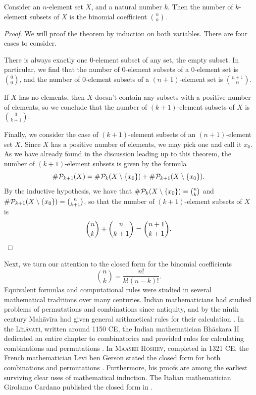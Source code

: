 \begin{theorem}
  Consider an $n$-element set $X$, and a natural number $k$. Then the number of $k$-element subsets of $X$ is the binomial coefficient $\binom{n}{k}$.
\end{theorem}

\begin{proof}
  We will proof the theorem by induction on both variables. There are four cases to consider.

  There is always exactly one $0$-element subset of any set, the empty subset. In particular, we find that the number of $0$-element subsets of a $0$-element set is $\binom{0}{0}$, and the number of $0$-element subsets of a $(n+1)$-element set is $\binom{n+1}{0}$.

  If $X$ has no elements, then $X$ doesn't contain any subsets with a positive number of elements, so we conclude that the number of $(k+1)$-element subsets of $X$ is $\binom{0}{k+1}$.

  Finally, we consider the case of $(k+1)$-element subsets of an $(n+1)$-element set $X$. Since $X$ has a positive number of elements, we may pick one and call it $x_0$. As we have already found in the discussion leading up to this theorem, the number of $(k+1)$-element subsets is given by the formula
  \begin{equation*}
    \mathord{\#}\mkern1mu \mathcal{P}_{k+1}(X)= \mathord{\#}\mkern1mu \mathcal{P}_k(X\setminus\{x_0\})+\mathord{\#}\mkern1mu \mathcal{P}_{k+1}(X\setminus\{x_0\}).
  \end{equation*}
  By the inductive hypothesis, we have that $\mathord{\#}\mkern1mu \mathcal{P}_k(X\setminus\{x_0\})=\binom{n}{k}$ and $\mathord{\#}\mkern1mu \mathcal{P}_{k+1}(X\setminus\{x_0\})=\binom{n}{k+1}$, so that the number of $(k+1)$-element subsets of $X$ is
  \begin{equation*}
    \binom{n}{k} + \binom{n}{k+1} = \binom{n+1}{k+1}.\qedhere
  \end{equation*}
\end{proof}

Next, we turn our attention to the closed form for the binomial coefficients
\begin{equation*}
  \binom{n}{k}=\frac{n!}{k!(n-k)!}.
\end{equation*}
Equivalent formulas and computational rules were studied in several mathematical traditions over many centuries. Indian mathematicians had studied problems of permutations and combinations since antiquity, and by the ninth century Mahāvīra had given general arithmetical rules for their calculation \cite{mahavira1912}. In the \textsc{Līlāvatī}, written around 1150 CE, the Indian mathematician Bhāskara II dedicated an entire chapter to combinatorics and provided rules for calculating combinations and permutations \cite{bhaskara1817}. In \textsc{Maaseh Hoshev}, completed in 1321 CE, the French mathematician Levi ben Gerson stated the closed form for both combinations and permutations \cite{gerson1909}. Furthermore, his proofs are among the earliest surviving clear uses of mathematical induction. The Italian mathematician Girolamo Cardano published the closed form in \cite{cardano1570}.

